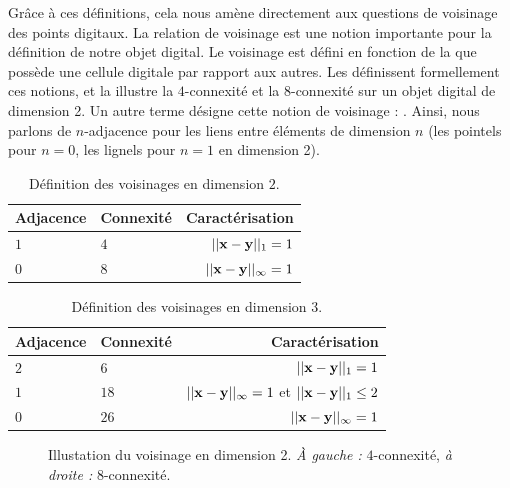 %
%
Grâce à ces définitions, cela nous amène directement aux questions de voisinage
des points digitaux. La relation de voisinage est une notion importante pour la
définition de notre objet digital. Le voisinage est défini en fonction de la
 que possède une cellule digitale par rapport aux autres.
Les  définissent formellement ces
notions, et la  illustre la $4$-connexité et la
$8$-connexité sur un objet digital de dimension 2. Un autre terme désigne cette
notion de voisinage : . Ainsi, nous parlons de
$n$-adjacence pour les liens entre éléments de dimension $n$ (\cad les pointels
pour $n=0$, les lignels pour $n=1$ en dimension 2).

\begin{table}[ht]
  \centering
  \caption{Définition des voisinages en dimension $2$.}
  \label{tab:adjacence2d}
    \renewcommand{\arraystretch}{1.1}
  \begin{tabular}{@{}llr@{}}
    \toprule
    Adjacence & Connexité  & Caractérisation \\ \midrule
    $1$ & $4$        & $||\mathbf{x} - \mathbf{y}||_1 = 1$ \\
    $0$ & $8$        & $||\mathbf{x} - \mathbf{y}||_\infty = 1$ \\
    \bottomrule
  \end{tabular}
\end{table}

\begin{table}[ht]
  \centering
  \caption{Définition des voisinages en dimension $3$.}
  \label{tab:adjacence3d}
    \renewcommand{\arraystretch}{1.1}
  \begin{tabular}{@{}llr@{}}
    \toprule
    Adjacence & Connexité  & Caractérisation \\ \midrule
    $2$ & $6$        & $||\mathbf{x} - \mathbf{y}||_1 = 1$ \\
    $1$ & $18$       & $||\mathbf{x} - \mathbf{y}||_\infty = 1$ et $||\mathbf{x} - \mathbf{y}||_1 \le 2$ \\
    $0$ & $26$       & $||\mathbf{x} - \mathbf{y}||_\infty = 1$ \\
    \bottomrule
  \end{tabular}
\end{table}

\begin{figure}[ht]
  \begin{center}
    
    \caption{Illustation du voisinage en dimension 2. \emph{À gauche :}
    $4$-connexité, \emph{à droite :} $8$-connexité.\label{fig:adjacence2d}}
  \end{center}
\end{figure}


